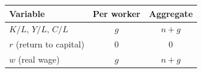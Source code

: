 \documentclass[a4paper,11pt]{article}
\begin{document}
\begin{resultbox}[title={BGP Growth Rates Summary}]
\begin{center}
\begin{tabular}{lcc}
\toprule
Variable & Per worker & Aggregate \\
\midrule
$K/L$, $Y/L$, $C/L$ & $g$ & $n+g$ \\
$r$ (return to capital) & $0$ & $0$ \\
$w$ (real wage) & $g$ & $n+g$ \\
\bottomrule
\end{tabular}
\end{center}
\end{resultbox}
\end{document}
